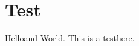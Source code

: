 \documentclass{article}
\newcommand{\cmdone}{Hello}
\def\cmdtwo{World}
\def\cmdthree{This is a test}
\begin{document}
\section{Test}
\cmdone and \cmdtwo. \cmdthree here.
\end{document}
